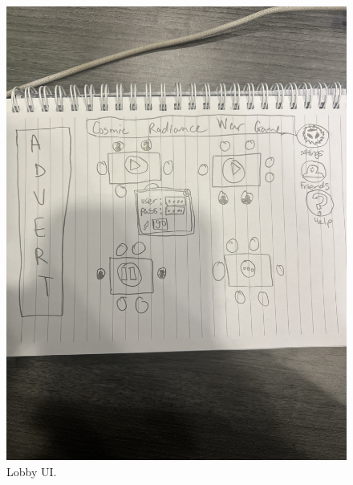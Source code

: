 \begin{figure}
    \centering
    \includegraphics[width=1\linewidth]{figures/Lobby UI.jpeg}
    \caption{Lobby UI.}
    \label{fig:enter-label}
\end{figure}

